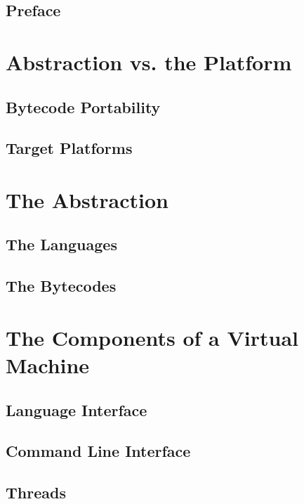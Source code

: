 
\section*{Preface}



\chapter{Abstraction vs. the Platform}

\section{Bytecode Portability}

\section{Target Platforms}

\chapter{The Abstraction}

\section{The Languages}

\section{The Bytecodes}

\chapter{The Components of a Virtual Machine}

\section{Language Interface}

\section{Command Line Interface}

\section{Threads}

